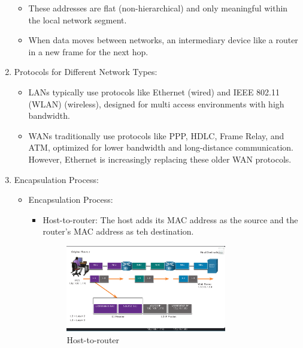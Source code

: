 \documentclass[a4paper,11pt]{article}
\begin{document}
\begin{enumerate}
\begin{itemize}
        \item These addresses are flat (non-hierarchical) and only meaningful within the local network segment.\\
        \item When data moves between networks, an intermediary device like a router in a new frame for the next hop.\\
    \end{itemize}
    \item Protocols for Different Network Types:\\
    \begin{itemize}
        \item LANs typically use protocols like Ethernet (wired) and IEEE 802.11 (WLAN) (wireless), designed for multi access environments with high bandwidth.\\
        \item WANs traditionally use protocols like PPP, HDLC, Frame Relay, and ATM, optimized for lower bandwidth and long-distance communication. However, Ethernet is increasingly replacing these older WAN protocols.\\
    \end{itemize}
    \item Encapsulation Process:\\
    \begin{itemize}
        \item Encapsulation Process:\\
        \begin{itemize}
            \item Host-to-router: The host adds its MAC address as the source and the router's MAC address as teh destination.\\

\begin{figure}[h!]
\centering
\includegraphics[width=0.75\textwidth]{34.png}
\caption{Host-to-router}
\label{fig:cap1}
\end{figure}


\end{itemize}
\end{itemize}
\end{enumerate}
\end{document}
